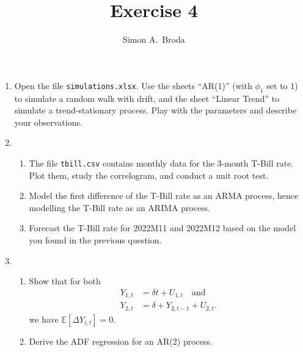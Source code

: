 \documentclass[11pt, a4paper]{article}
\newcommand{\E}{\ensuremath{{\mathbb E}}} %
\begin{document}
\title{Exercise 4}
\author{Simon A.\ Broda}
\date{}
\maketitle

\begin{enumerate}
\item  Open the file \texttt{simulations.xlsx}. Use the sheets ``AR(1)'' (with $\phi_1$ set to 1) to simulate a random walk with drift, and the sheet ``Linear Trend'' to simulate a trend-stationary process. Play with the parameters and describe your observations.
\item
\begin{enumerate}
\item The file \texttt{tbill.csv} contains monthly data for the 3-month T-Bill rate. Plot them, study the correlogram, and conduct a unit root test.
\item Model the first difference of the T-Bill rate as an ARMA process, hence modelling the T-Bill rate as an ARIMA process.
\item Forecast the T-Bill rate for 2022M11 and 2022M12 based on the model you found in the previous question.
\end{enumerate}
\item
\begin{enumerate}

\item Show that for both \begin{align*}
Y_{1,t}&=\delta t+U_{1,t} \quad\mbox{and}\\
Y_{2,t}&=\delta + Y_{2,t-1}+U_{2,t}.
\end{align*}
we have $\E[\Delta Y_{i, t}]=0$.
\item Derive the ADF regression for an AR(2) process.
\end{enumerate}


\end{enumerate}
\end{document}
